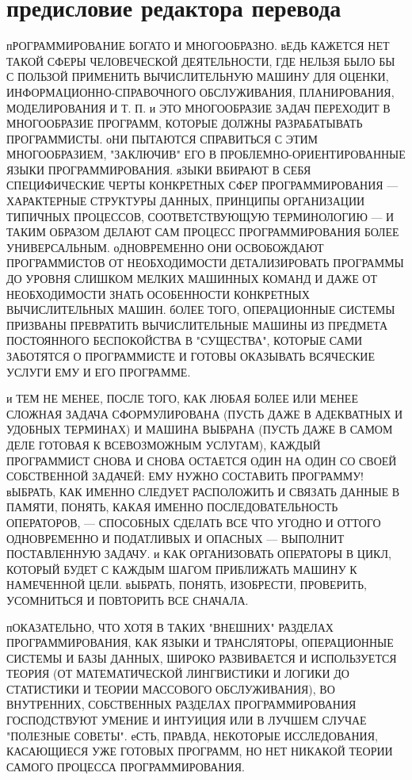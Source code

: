 
\chapter{предисловие редактора перевода}

пРОГРАММИРОВАНИЕ БОГАТО И МНОГООБРАЗНО. вЕДЬ КАЖЕТСЯ НЕТ ТАКОЙ СФЕРЫ 
ЧЕЛОВЕЧЕСКОЙ ДЕЯТЕЛЬНОСТИ, ГДЕ НЕЛЬЗЯ БЫЛО БЫ  С ПОЛЬЗОЙ ПРИМЕНИТЬ 
ВЫЧИСЛИТЕЛЬНУЮ МАШИНУ ДЛЯ ОЦЕНКИ, ИНФОРМАЦИОННО-СПРАВОЧНОГО ОБСЛУЖИВАНИЯ,
ПЛАНИРОВАНИЯ, МОДЕЛИРОВАНИЯ И Т. П. и ЭТО МНОГООБРАЗИЕ ЗАДАЧ ПЕРЕХОДИТ 
В МНОГООБРАЗИЕ ПРОГРАММ, КОТОРЫЕ ДОЛЖНЫ РАЗРАБАТЫВАТЬ ПРОГРАММИСТЫ. 
оНИ ПЫТАЮТСЯ СПРАВИТЬСЯ С ЭТИМ МНОГООБРАЗИЕМ, "ЗАКЛЮЧИВ" ЕГО В 
ПРОБЛЕМНО-ОРИЕНТИРОВАННЫЕ ЯЗЫКИ ПРОГРАММИРОВАНИЯ. яЗЫКИ ВБИРАЮТ В СЕБЯ 
СПЕЦИФИЧЕСКИЕ ЧЕРТЫ КОНКРЕТНЫХ СФЕР ПРОГРАММИРОВАНИЯ --- ХАРАКТЕРНЫЕ СТРУКТУРЫ 
ДАННЫХ, ПРИНЦИПЫ ОРГАНИЗАЦИИ ТИПИЧНЫХ ПРОЦЕССОВ, СООТВЕТСТВУЮЩУЮ 
ТЕРМИНОЛОГИЮ --- И ТАКИМ ОБРАЗОМ ДЕЛАЮТ САМ ПРОЦЕСС ПРОГРАММИРОВАНИЯ БОЛЕЕ
УНИВЕРСАЛЬНЫМ. оДНОВРЕМЕННО ОНИ ОСВОБОЖДАЮТ ПРОГРАММИСТОВ ОТ НЕОБХОДИМОСТИ 
ДЕТАЛИЗИРОВАТЬ ПРОГРАММЫ ДО УРОВНЯ СЛИШКОМ МЕЛКИХ МАШИННЫХ КОМАНД
И ДАЖЕ ОТ НЕОБХОДИМОСТИ ЗНАТЬ ОСОБЕННОСТИ КОНКРЕТНЫХ ВЫЧИСЛИТЕЛЬНЫХ МАШИН. 
бОЛЕЕ ТОГО, ОПЕРАЦИОННЫЕ СИСТЕМЫ ПРИЗВАНЫ ПРЕВРАТИТЬ ВЫЧИСЛИТЕЛЬНЫЕ МАШИНЫ 
ИЗ ПРЕДМЕТА ПОСТОЯННОГО БЕСПОКОЙСТВА  В "СУЩЕСТВА", КОТОРЫЕ САМИ ЗАБОТЯТСЯ
О ПРОГРАММИСТЕ И ГОТОВЫ  ОКАЗЫВАТЬ ВСЯЧЕСКИЕ УСЛУГИ ЕМУ И ЕГО ПРОГРАММЕ.

и ТЕМ НЕ МЕНЕЕ, ПОСЛЕ ТОГО, КАК ЛЮБАЯ БОЛЕЕ ИЛИ МЕНЕЕ СЛОЖНАЯ ЗАДАЧА 
СФОРМУЛИРОВАНА (ПУСТЬ ДАЖЕ В АДЕКВАТНЫХ И УДОБНЫХ ТЕРМИНАХ) И МАШИНА ВЫБРАНА
(ПУСТЬ ДАЖЕ В САМОМ ДЕЛЕ ГОТОВАЯ К ВСЕВОЗМОЖНЫМ УСЛУГАМ), КАЖДЫЙ ПРОГРАММИСТ 
СНОВА И СНОВА ОСТАЕТСЯ ОДИН НА ОДИН СО СВОЕЙ СОБСТВЕННОЙ ЗАДАЧЕЙ: ЕМУ НУЖНО 
СОСТАВИТЬ ПРОГРАММУ! вЫБРАТЬ, КАК ИМЕННО СЛЕДУЕТ РАСПОЛОЖИТЬ И СВЯЗАТЬ ДАННЫЕ 
В ПАМЯТИ, ПОНЯТЬ, КАКАЯ ИМЕННО ПОСЛЕДОВАТЕЛЬНОСТЬ ОПЕРАТОРОВ, --- СПОСОБНЫХ 
СДЕЛАТЬ ВСЕ ЧТО УГОДНО И ОТТОГО ОДНОВРЕМЕННО И ПОДАТЛИВЫХ И 
ОПАСНЫХ --- ВЫПОЛНИТ ПОСТАВЛЕННУЮ ЗАДАЧУ. и КАК ОРГАНИЗОВАТЬ ОПЕРАТОРЫ В 
ЦИКЛ, КОТОРЫЙ БУДЕТ С КАЖДЫМ ШАГОМ ПРИБЛИЖАТЬ МАШИНУ К НАМЕЧЕННОЙ ЦЕЛИ. 
вЫБРАТЬ, ПОНЯТЬ, ИЗОБРЕСТИ, ПРОВЕРИТЬ, УСОМНИТЬСЯ И ПОВТОРИТЬ ВСЕ СНАЧАЛА.
   
пОКАЗАТЕЛЬНО, ЧТО ХОТЯ В ТАКИХ "ВНЕШНИХ" РАЗДЕЛАХ ПРОГРАММИРОВАНИЯ,  КАК 
ЯЗЫКИ И ТРАНСЛЯТОРЫ, ОПЕРАЦИОННЫЕ СИСТЕМЫ И БАЗЫ ДАННЫХ, ШИРОКО РАЗВИВАЕТСЯ И 
ИСПОЛЬЗУЕТСЯ ТЕОРИЯ (ОТ МАТЕМАТИЧЕСКОЙ ЛИНГВИСТИКИ И ЛОГИКИ ДО СТАТИСТИКИ И 
ТЕОРИИ МАССОВОГО ОБСЛУЖИВАНИЯ), ВО ВНУТРЕННИХ, СОБСТВЕННЫХ РАЗДЕЛАХ 
ПРОГРАММИРОВАНИЯ ГОСПОДСТВУЮТ УМЕНИЕ И ИНТУИЦИЯ ИЛИ В ЛУЧШЕМ СЛУЧАЕ 
"ПОЛЕЗНЫЕ СОВЕТЫ". еСТЬ, ПРАВДА, НЕКОТОРЫЕ ИССЛЕДОВАНИЯ, КАСАЮЩИЕСЯ УЖЕ
ГОТОВЫХ ПРОГРАММ, НО НЕТ НИКАКОЙ ТЕОРИИ САМОГО ПРОЦЕССА ПРОГРАММИРОВАНИЯ.
     
